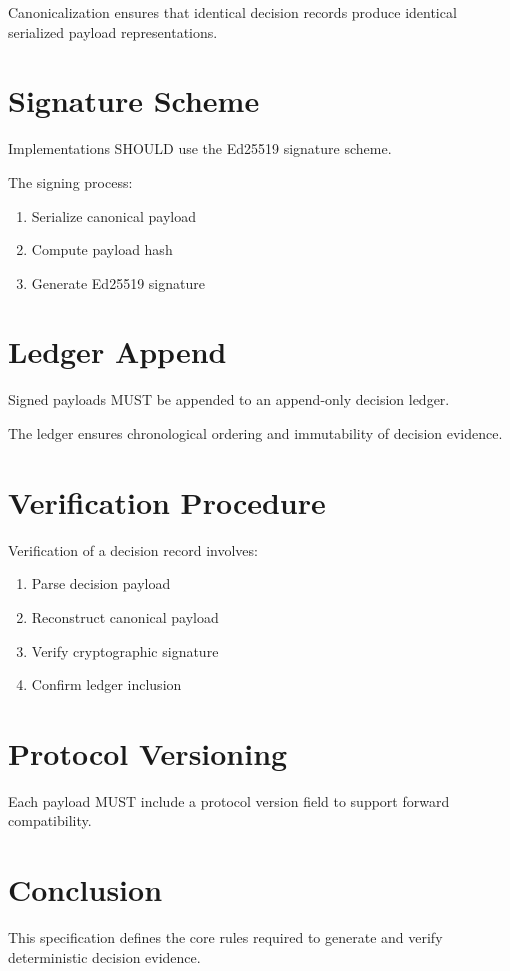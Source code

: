 \documentclass[11pt]{article}
\begin{document}
Canonicalization ensures that identical decision records
produce identical serialized payload representations.

\section{Signature Scheme}

Implementations SHOULD use the Ed25519 signature scheme.

The signing process:

\begin{enumerate}
\item Serialize canonical payload
\item Compute payload hash
\item Generate Ed25519 signature
\end{enumerate}

\section{Ledger Append}

Signed payloads MUST be appended to an append-only
decision ledger.

The ledger ensures chronological ordering and
immutability of decision evidence.

\section{Verification Procedure}

Verification of a decision record involves:

\begin{enumerate}
\item Parse decision payload
\item Reconstruct canonical payload
\item Verify cryptographic signature
\item Confirm ledger inclusion
\end{enumerate}

\section{Protocol Versioning}

Each payload MUST include a protocol version field
to support forward compatibility.

\section{Conclusion}

This specification defines the core rules required
to generate and verify deterministic decision evidence.
\end{document}

